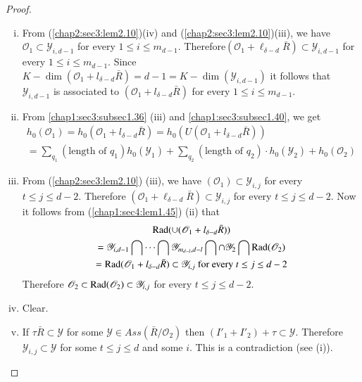 \begin{proof}
 \begin{enumerate}[(i)]
  \item From (\ref{chap2:sec3:lem2.10})(iv) and
    (\ref{chap2:sec3:lem2.10})(iii), we have $\mathscr{O}_1 
    \subset \mathscr{Y}_{i,d-1}$ for every $1\leq i \leq
    m_{d-1}$. Therefore\pageoriginale $(\mathscr{O}_1+\ell_{\delta
      -d}\bar{R})\subset \mathscr{Y}_{i,d-1}$ for every $1\leq i \leq
    m_{d-1}$. Since $K-\dim
    (\mathscr{O}_1+l_{\delta-d}\bar{R})=d-1=K-\dim
    (\mathscr{Y}_{i,d-1})$ it follows that $\mathscr{Y}_{i,d-1}$ is
    associated to $(\mathscr{O}_1+l_{\delta-d}\bar{R})$ for every $1
    \leq i \leq m_{d-1}$.  
  \item From \ref{chap1:sec3:subsec1.36} (iii) and
    \ref{chap1:sec3:subsec1.40}, we get 
    \begin{multline*}
      h_0(\mathscr{O}_1)=h_0 (\mathscr{O}_1+l_{\delta-d}\bar{R}) =h_0
      (U(\mathscr{O}_1+l_{\delta-d}\bar{R}))\\ 
      =\sum _{q_1}(\text{length of } q_1)
      h_0(\mathscr{Y}_1)+\sum_{q_2} (\text {length of } q_2)\cdot h_0
      (\mathscr{Y}_2)+h_0(\mathscr{O}_2) 
    \end{multline*}
  \item From (\ref{chap2:sec3:lem2.10}) (iii), we have $(\mathscr{O}_1)\subset
    \mathscr{Y}_{i,j}$ for every $t \leq j \leq d-2$. Therefore
    $(\mathscr{O}_1 + \ell_{\delta - d} \bar{R}) \subset
    \mathscr{Y}_{i, j}$  for every $t\leq j \leq d-2$. Now it follows
    from (\ref{chap1:sec4:lem1.45}) (ii) that 
    \begin{multline*}
      \operatorname{Rad} 
      (\cup(\mathscr{O}_1+l_{\delta-d}\bar{R}))\\
      =\mathscr{Y}_{i,d-1}\bigcap
      \cdots \bigcap \mathscr{Y}_{m_{d-l},d-l} \bigcap \cap
      \mathscr{Y}_2 \bigcap \operatorname{Rad}  (\mathscr{O}_2)\\ 
      =\operatorname{Rad}  (\mathscr{O}_1+l_{\delta-d}\bar{R}) \subset
      \mathscr{Y}_{i,j} ~\text{for every}~ t \leq j \leq d-2 
    \end{multline*}
    Therefore $\mathscr{O}_2 \subset \operatorname{Rad} (\mathscr{O}_2)\subset
    \mathscr{Y}_{i,j}$ for every $t \leq j \leq d-2$. 
  \item Clear.
  \item If $\tau \bar{R} \subset \mathscr{Y}$ for some $\mathscr{Y}\in
    Ass (\bar{R}/\mathscr{O}_2)$ then $(I'_1+I'_2)+ \tau \subset
    \mathscr{Y}$. Therefore $\mathscr{Y}_{i,j} \subset \mathscr{Y}$
    for some $t \leq j \leq d$ and some $i$. This is a contradiction
    (see (i)). 
\end{enumerate}
\end{proof} 
 
